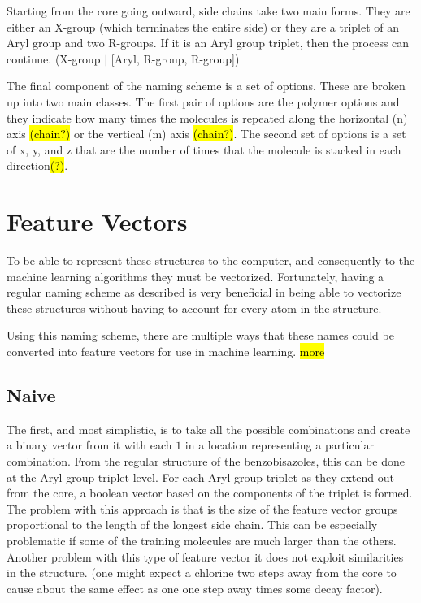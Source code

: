 \documentclass[10pt]{article}
\begin{document}
Starting from the core going outward, side chains take two main forms. They are either an X-group (which terminates the entire side) or they are a triplet of an Aryl group and two R-groups. If it is an Aryl group triplet, then the process can continue. (X-group $\vert$ [Aryl, R-group, R-group])

The final component of the naming scheme is a set of options. These are broken up into two main classes. The first pair of options are the polymer options and they indicate how many times the molecules is repeated along the horizontal (n) axis \hl{(chain?)} or the vertical (m) axis \hl{(chain?)}. The second set of options is a set of x, y, and z that are the number of times that the molecule is stacked in each direction\hl{(?)}.


\section{Feature Vectors}

To be able to represent these structures to the computer, and consequently to the machine learning algorithms they must be vectorized. Fortunately, having a regular naming scheme as described is very beneficial in being able to vectorize these structures without having to account for every atom in the structure.

Using this naming scheme, there are multiple ways that these names could be converted into feature vectors for use in machine learning. \hl{more}


\subsection{Naive}

The first, and most simplistic, is to take all the possible combinations and create a binary vector from it with each $1$ in a location representing a particular combination. From the regular structure of the benzobisazoles, this can be done at the Aryl group triplet level. For each Aryl group triplet as they extend out from the core, a boolean vector based on the components of the triplet is formed. The problem with this approach is that is the size of the feature vector groups proportional to the length of the longest side chain. This can be especially problematic if some of the training molecules are much larger than the others. Another problem with this type of feature vector it does not exploit similarities in the structure. (one might expect a chlorine two steps away from the core to cause about the same effect as one one step away times some decay factor).
\end{document}
